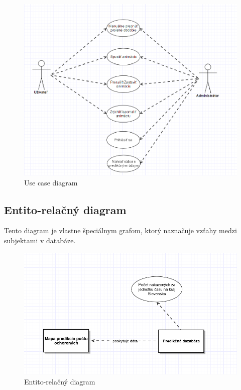 \documentclass[12pt,a4paper]{report}
\begin{document}
\begin{figure}[htb]
	\centering
	\includegraphics[scale=0.6]{use_case_diagram}
	\caption{Use case diagram}
	\label{fig:Use case diagram}
\end{figure}


\FloatBarrier
\clearpage
\subsection[Entito-relačný diagram]{\rmfamily\bfseries
	Entito-relačný diagram}
Tento diagram je vlastne špeciálnym grafom, ktorý naznačuje vzťahy medzi subjektami v databáze.

\begin{figure}[htb]
	\centering
	\includegraphics[scale=0.7]{E-R_diagram}
	\caption{Entito-relačný diagram}
	\label{fig:Entito-relačný diagram}
\end{figure}
\end{document}
